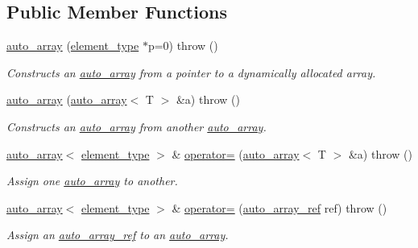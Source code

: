 \subsection*{\-Public \-Member \-Functions}
\begin{DoxyCompactItemize}
\item 
\hyperlink{classLibWheel_1_1auto__array_a1698c30facc58f8273d7c7f9a3621e03}{auto\-\_\-array} (\hyperlink{classLibWheel_1_1auto__array_a8c06b91597d32a42388eaad80ae5f656}{element\-\_\-type} $\ast$p=0)  throw ()
\begin{DoxyCompactList}\small\item\em \-Constructs an \hyperlink{classLibWheel_1_1auto__array}{auto\-\_\-array} from a pointer to a dynamically allocated array. \end{DoxyCompactList}\item 
\hyperlink{classLibWheel_1_1auto__array_a3cabe016ed7e616da4eedb051aa5c4bf}{auto\-\_\-array} (\hyperlink{classLibWheel_1_1auto__array}{auto\-\_\-array}$<$ \-T $>$ \&a)  throw ()
\begin{DoxyCompactList}\small\item\em \-Constructs an \hyperlink{classLibWheel_1_1auto__array}{auto\-\_\-array} from another \hyperlink{classLibWheel_1_1auto__array}{auto\-\_\-array}. \end{DoxyCompactList}\item 
\hyperlink{classLibWheel_1_1auto__array}{auto\-\_\-array}$<$ \hyperlink{classLibWheel_1_1auto__array_a8c06b91597d32a42388eaad80ae5f656}{element\-\_\-type} $>$ \& \hyperlink{classLibWheel_1_1auto__array_aad8d46e0a529612fa2b7eaa6124f3621}{operator=} (\hyperlink{classLibWheel_1_1auto__array}{auto\-\_\-array}$<$ \-T $>$ \&a)  throw ()
\begin{DoxyCompactList}\small\item\em \-Assign one \hyperlink{classLibWheel_1_1auto__array}{auto\-\_\-array} to another. \end{DoxyCompactList}\item 
\hyperlink{classLibWheel_1_1auto__array}{auto\-\_\-array}$<$ \hyperlink{classLibWheel_1_1auto__array_a8c06b91597d32a42388eaad80ae5f656}{element\-\_\-type} $>$ \& \hyperlink{classLibWheel_1_1auto__array_af219ff28ca72556578c591db347815ef}{operator=} (\hyperlink{structLibWheel_1_1auto__array_1_1auto__array__ref}{auto\-\_\-array\-\_\-ref} ref)  throw ()
\begin{DoxyCompactList}\small\item\em \-Assign an \hyperlink{structLibWheel_1_1auto__array_1_1auto__array__ref}{auto\-\_\-array\-\_\-ref} to an \hyperlink{classLibWheel_1_1auto__array}{auto\-\_\-array}. \end{DoxyCompactList}\item 

\end{DoxyCompactItemize}
